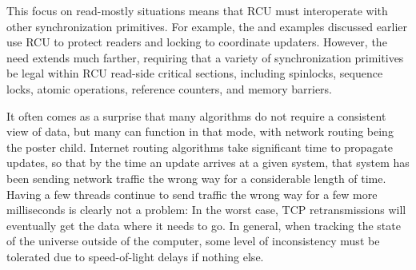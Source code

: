 This focus on read-mostly situations means that RCU must interoperate
with other synchronization primitives.
For example, the  and
 examples discussed earlier use RCU to
protect readers and locking to coordinate updaters.
However, the need
extends much farther, requiring that a variety of synchronization
primitives be legal within RCU read-side critical sections, including
spinlocks, sequence locks, atomic operations, reference counters, and
memory barriers.

\QuickQuizEnd

It often comes as a surprise that many algorithms do not require a
consistent view of data, but many can function in that mode, with
network routing being the poster child.
Internet routing algorithms take
significant time to propagate updates, so that by the time an update
arrives at a given system, that system has been sending network traffic
the wrong way for a considerable length of time.
Having a few threads
continue to send traffic the wrong way for a few more milliseconds is
clearly not a problem:
In the worst case, TCP retransmissions will
eventually get the data where it needs to go.
In general, when tracking
the state of the universe outside of the computer, some level of
inconsistency must be tolerated due to speed-of-light delays if nothing
else.

